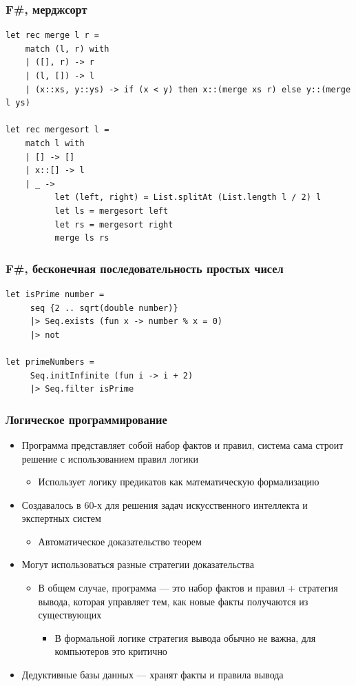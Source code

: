 \documentclass[xetex,mathserif,serif]{beamer}
\begin{document}
	\begin{frame}[fragile]
		\frametitle{F\#, мерджсорт}
		\begin{small}
			\begin{verbatim}
let rec merge l r =
    match (l, r) with
    | ([], r) -> r
    | (l, []) -> l
    | (x::xs, y::ys) -> if (x < y) then x::(merge xs r) else y::(merge l ys)
 
let rec mergesort l = 
    match l with
    | [] -> []
    | x::[] -> l
    | _ -> 
          let (left, right) = List.splitAt (List.length l / 2) l
          let ls = mergesort left
          let rs = mergesort right
          merge ls rs
			\end{verbatim}
		\end{small}
	\end{frame}

	\begin{frame}[fragile]
		\frametitle{F\#, бесконечная последовательность простых чисел}
		\begin{verbatim}
let isPrime number =
     seq {2 .. sqrt(double number)}
     |> Seq.exists (fun x -> number % x = 0) 
     |> not

let primeNumbers =
     Seq.initInfinite (fun i -> i + 2)
     |> Seq.filter isPrime
		\end{verbatim}
	\end{frame}

	\begin{frame}
		\frametitle{Логическое программирование}
		\begin{itemize}
			\item Программа представляет собой набор фактов и правил, система сама строит решение с использованием правил логики
			\begin{itemize}
				\item Использует логику предикатов как математическую формализацию
			\end{itemize}
			\item Создавалось в 60-х для решения задач искусственного интеллекта и экспертных систем
			\begin{itemize}
				\item Автоматическое доказательство теорем
			\end{itemize}
			\item Могут использоваться разные стратегии доказательства
			\begin{itemize}
				\item В общем случае, программа --- это набор фактов и правил + стратегия вывода, которая управляет тем, как новые факты получаются из существующих
				\begin{itemize}
					\item В формальной логике стратегия вывода обычно не важна, для компьютеров это критично
				\end{itemize}
			\end{itemize}
			\item Дедуктивные базы данных --- хранят факты и правила вывода
		\end{itemize}
	\end{frame}
\end{document}
